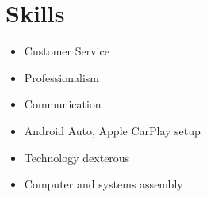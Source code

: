 \section{Skills}
\begin{itemize}
    \item Customer Service
    \item Professionalism
    \item Communication
    \item Android Auto, Apple CarPlay setup
    \item Technology dexterous
    \item Computer and systems assembly
\end{itemize}
